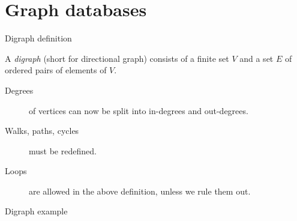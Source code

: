 

\section{Graph databases}


\begin{frame}{Digraph definition}
  \begin{definition}
    A \emph{digraph} (short for directional graph) consists of a finite set $V$ and a set $E$ of ordered pairs of elements of $V$.
  \end{definition}
  \vspace{0.25cm}
  \begin{description}
    \item[Degrees] of vertices can now be split into in-degrees and out-degrees.
    \item[Walks, paths, cycles] must be redefined.
    \item[Loops] are allowed in the above definition, unless we rule them out.
  \end{description}
\end{frame}


\begin{frame}{Digraph example}
  \begin{center}
  \end{center}
\end{frame}

